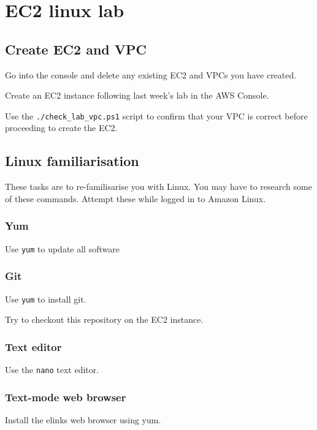 \chapter{EC2 linux lab}

\section{Create EC2 and VPC}\label{create-ec2-and-vpc}

Go into the console and delete any existing EC2 and VPCs you have
created.

Create an EC2 instance following last week's lab in the AWS Console.

Use the \texttt{./check\_lab\_vpc.ps1} script to confirm that your VPC is correct before proceeding to create the EC2.


\section{Linux familiarisation}\label{linux-familiarisation}

These tasks are to re-familisarise you with Linux.
You may have to research some of these commands. 
Attempt these while logged in to Amazon Linux.

\subsection{Yum}
\label{yum}

Use \texttt{yum} to update all software

\subsection{Git}
\label{git}

Use \texttt{yum} to install git.

Try to checkout this repository on the EC2 instance.

\subsection{Text editor}\label{text-editor}

Use the \texttt{nano} text editor.

\subsection{Text-mode web browser}

Install the elinks web browser using yum. 

